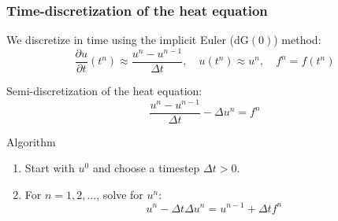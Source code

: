 \begin{frame}
  \frametitle{Time-discretization of the heat equation}

  \bigskip

  We discretize in time using the implicit Euler ($\mathrm{dG}(0)$) method:
  \begin{equation*}
    \frac{\partial u}{\partial t}(t^n) \approx \frac{u^n - u^{n-1}}{\Delta t},
    \quad
    u(t^n) \approx u^n,
    \quad
    f^n = f(t^n)
  \end{equation*}

  Semi-discretization of the heat equation:
  \begin{equation*}
    \frac{u^n - u^{n-1}}{\Delta t} - \Delta u^n = f^n
  \end{equation*}

  \begin{block}{Algorithm}
    \begin{enumerate}
  \item
    Start with $u^0$ and choose a timestep $\Delta t > 0$.
  \item
    For $n = 1, 2, \ldots$, solve for $u^n$:
    \begin{equation*}
      u^n - {\Delta t}\Delta u^n = u^{n-1} + {\Delta t} f^n
    \end{equation*}
    \end{enumerate}
  \end{block}

\end{frame}
